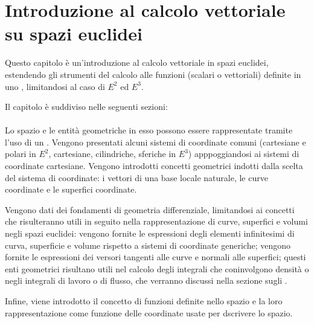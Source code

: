 \documentclass[letterpaper,10pt,italian]{jupyterBook}
\begin{document}
\chapter{Introduzione al calcolo vettoriale su spazi euclidei}
\label{\detokenize{ch/vector-calculus:introduzione-al-calcolo-vettoriale-su-spazi-euclidei}}\label{\detokenize{ch/vector-calculus:vector-calculus-intro}}\label{\detokenize{ch/vector-calculus::doc}}
\sphinxAtStartPar
Questo capitolo è un’introduzione al calcolo vettoriale in spazi euclidei, estendendo gli strumenti del calcolo alle funzioni (scalari o vettoriali) definite in uno {\hyperref[\detokenize{ch/analytic_geometry/euclidean_space:geometry-analytic-euclidean-space}]{}}, limitandosi al caso di \(E^2\) ed \(E^3\).

\sphinxAtStartPar
Il capitolo è suddiviso nelle seguenti sezioni:
\subsubsection*{}

\sphinxAtStartPar
Lo spazio e le entità geometriche in esso possono essere rappresentate tramite l’uso di un . Vengono presentati alcuni sistemi di coordinate comuni (cartesiane e polari in \(E^2\), cartesiane, cilindriche, sferiche in \(E^3\)) apppoggiandosi ai sistemi di coordinate cartesiane. Vengono introdotti concetti geometrici indotti dalla scelta del sistema di coordinate: i vettori di una base locale naturale, le curve coordinate e le superfici coordinate.

\sphinxAtStartPar
Vengono dati dei fondamenti di geometria differenziale, limitandosi ai concetti che risulteranno utili in seguito nella rappresentazione di curve, superfici e volumi negli spazi euclidei: vengono fornite le espressioni degli elementi infinitesimi di curva, superficie e volume rispetto a sistemi di coordinate generiche; vengono fornite le espressioni dei versori tangenti alle curve e normali alle superfici; questi enti geometrici risultano utili nel calcolo degli integrali che coninvolgono densità o negli integrali di lavoro o di flusso, che verranno discussi nella sezione sugli {\hyperref[\detokenize{ch/vector-calculus/integrals:vector-calculus-integrals}]{}}.

\sphinxAtStartPar
Infine, viene introdotto il concetto di  \sphinxhyphen{} funzioni definite nello spazio \sphinxhyphen{} e la loro rappresentazione come funzione delle coordinate usate per dscrivere lo spazio.
\end{document}
